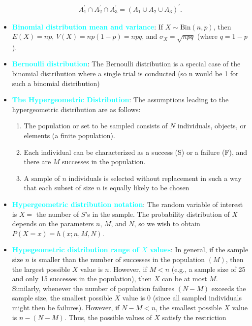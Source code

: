 \documentclass{report}
\begin{document}
\begin{itemize}
        \begin{align*}
            A_{1}^{\prime} \cap A_{2}^{\prime} \cap A_{3}^{\prime} = (A_{1} \cup A_{2} \cup A_{3})^{\prime}
        .\end{align*}
    \item \textbf{\textcolor{cyan}{Binomial distribution mean and variance}}:
        If \( X \sim \text{Bin}(n, p) \), then \( E(X) = np \), \( V(X) = np(1 - p) = npq \), and \( \sigma_X = \sqrt{npq} \) (where \( q = 1 - p \)).
    \item \textbf{\textcolor{cyan}{Bernoulli distribution}}:
        The Bernoulli distribution is a special case of the binomial distribution where a single trial is conducted (so n would be 1 for such a binomial distribution)
    \item \textbf{\textcolor{cyan}{The Hypergeometric Distribution}}:
        The assumptions leading to the hypergeometric distribution are as follows:
        \begin{enumerate}
            \item The population or set to be sampled consists of $N$ individuals, objects, or elements (a finite population).
            \item Each individual can be characterized as a success (S) or a failure (F), and there are $M$ successes in the population.
            \item A sample of $n$ individuals is selected without replacement in such a way that each subset of size $n$ is equally likely to be chosen
        \end{enumerate}
    \item \textbf{\textcolor{cyan}{Hypergeometric distribution notation}}:
        The random variable of interest is \( X = \) the number of \( S \)'s in the sample. The probability distribution of \( X \) depends on the parameters \( n \), \( M \), and \( N \), so we wish to obtain \( P(X = x) = h(x; n, M, N) \).
    \item \textbf{\textcolor{cyan}{Hypegeometric distribution range of $X$ values}}: In general, if the sample size $n$ is smaller than the number of successes in the population $(M)$, then the largest possible $X$ value is $n$. However, if $M < n$ (e.g., a sample size of 25 and only 15 successes in the population), then $X$ can be at most $M$. Similarly, whenever the number of population failures $(N - M)$ exceeds the sample size, the smallest possible $X$ value is 0 (since all sampled individuals might then be failures). However, if $N - M < n$, the smallest possible $X$ value is $n - (N - M)$. Thus, the possible values of $X$ satisfy the restriction 

\end{itemize}
\end{document}
